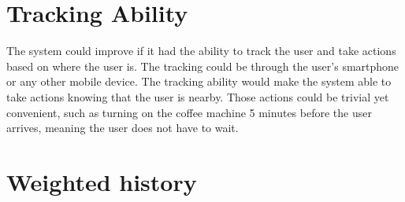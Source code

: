 \section{Tracking Ability}
The system could improve if it had the ability to track the user and take actions based on where the user is. The tracking could be through the user's smartphone or any other mobile device. The tracking ability would make the system able to take actions knowing that the user is nearby. Those actions could be trivial yet convenient, such as turning on the coffee machine 5 minutes before the user arrives, meaning the user does not have to wait.

\section{Weighted history}
